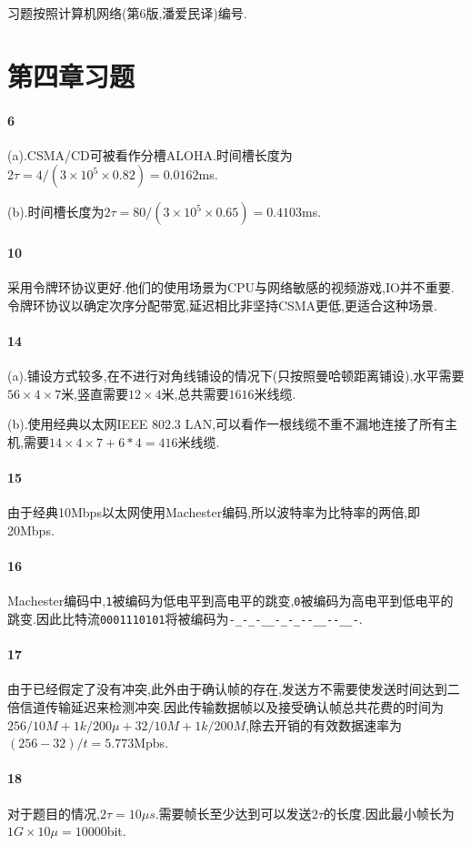 \documentclass[a4paper]{article}
\begin{document}
\courseheader
{}
习题按照计算机网络(第6版,潘爱民译)编号.
\section{第四章习题}
\paragraph{6} (a).CSMA/CD可被看作分槽ALOHA.时间槽长度为$2\tau=4/(3\times10^5\times0.82)=0.0162$ms.

(b).时间槽长度为$2\tau=80/(3\times10^5\times0.65)=0.4103$ms.
\paragraph{10}
采用令牌环协议更好.他们的使用场景为CPU与网络敏感的视频游戏,IO并不重要.令牌环协议以确定次序分配带宽,延迟相比非坚持CSMA更低,更适合这种场景.
\paragraph{14}
(a).铺设方式较多,在不进行对角线铺设的情况下(只按照曼哈顿距离铺设),水平需要$56\times4\times7$米,竖直需要$12\times4$米,总共需要$1616$米线缆.

(b).使用经典以太网IEEE 802.3 LAN,可以看作一根线缆不重不漏地连接了所有主机,需要$14\times4\times7+6*4=416$米线缆.
\paragraph{15}
由于经典10Mbps以太网使用Machester编码,所以波特率为比特率的两倍,即20Mbps.
\paragraph{16}
Machester编码中,\verb|1|被编码为低电平到高电平的跳变,\verb|0|被编码为高电平到低电平的跳变.因此比特流\verb|0001110101|将被编码为\verb|-_-_-__-_-_--__--__-|.
\paragraph{17}
由于已经假定了没有冲突,此外由于确认帧的存在,发送方不需要使发送时间达到二倍信道传输延迟来检测冲突.因此传输数据帧以及接受确认帧总共花费的时间为$256/10M+1k/200\mu+32/10M+1k/200M$,除去开销的有效数据速率为$(256-32)/t=5.773$Mpbs.
\paragraph{18}
对于题目的情况,$2\tau=10\mu s$.需要帧长至少达到可以发送$2\tau$的长度.因此最小帧长为$1G\times10\mu=10000$bit.
\end{document}
